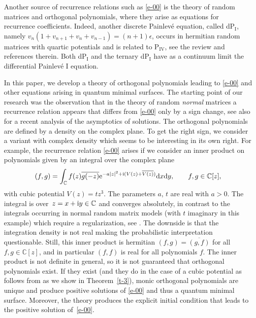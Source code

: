 \documentclass[10pt,a4paper]{amsart}
\numberwithin{equation}{section}
\theoremstyle{definition}
\begin{document}
Another source of recurrence relations such as \eqref{e-00} is the theory of random matrices and orthogonal polynomials, where they arise as equations for recurrence coefficients. Indeed, another discrete Painlev\'e equation, called dP{}$_{\mathrm I}$, namely
$v_n(1+v_{n+1}+v_n+v_{n-1})=(n+1)\epsilon$,
occurs in hermitian random matrices with quartic potentials and is related to P${}_{\mathrm{IV}}$, see the review \cite{Its2011} and references therein. Both dP{}$_{\mathrm I}$ and the ternary dP{}$_{\mathrm I}$ have as a continuum limit the differential Painlev\'e I equation.

In this paper, we develop a theory of orthogonal polynomials leading to \eqref{e-00} and other equations arising in quantum minimal surfaces. The starting point of our research was the observation that in the theory of random {\em normal} matrices \cite{WiegmannZabrodin2000} a recurrence relation appears \cite{TBAZW2005} that differs from \eqref{e-00} only by a sign change,
see also \cite{AptekarevNovokshenov} for a recent analysis of the asymptotics of solutions. The orthogonal polynomials are defined by a density on the complex plane. To get the right sign, we consider a variant with complex density which seems to be interesting in its own right. For example, the recurrence relation \eqref{e-00} arises if we consider an inner product on polynomials given by an integral over the complex plane
\begin{equation}\label{e-ip}
(f,g)=\int_{\mathbb C}f(z)\overline{g(-z)}{\rm e}^{{-a|z|^2+{\rm i} (V(z)+\overline{V(z)})}}{\rm d}x{\rm d}y,\qquad f,g\in\mathbb C[z],
\end{equation}
with cubic potential $V(z)=tz^3$. The parameters $a$, $t$ are real with $a>0$. The integral is over~${z=x+{\rm i}y\in\mathbb C}$ and converges absolutely, in contrast to the integrals occurring in normal random matrix models (with $t$ imaginary in this example) \cite{Elbau2007,TBAZW2005,WiegmannZabrodin2000} which require a regularization, see \cite{BleherKuijlaars2012,ElbauFelder2005}.
The downside is that the integration density is not real making the probabilistic interpretation questionable.
Still, this inner product is hermitian
$
(f,g)=\overline{(g,f)} $ for all $ f,g\in\mathbb C[z]$,
and in particular $(f,f)$ is real for all polynomials $f$.
The inner product is not definite in general, so it is not guaranteed that orthogonal polynomials exist. If they exist (and they do in the case of a cubic potential as follows from \cite{CDHM2025,Hoppe2025} as we show in Theorem~\ref{t-3}), monic orthogonal polynomials are unique and produce positive solutions of \eqref{e-00} and thus a quantum minimal surface. Moreover, the theory produces the explicit initial condition that leads to the positive solution of~\eqref{e-00}.
\end{document}
